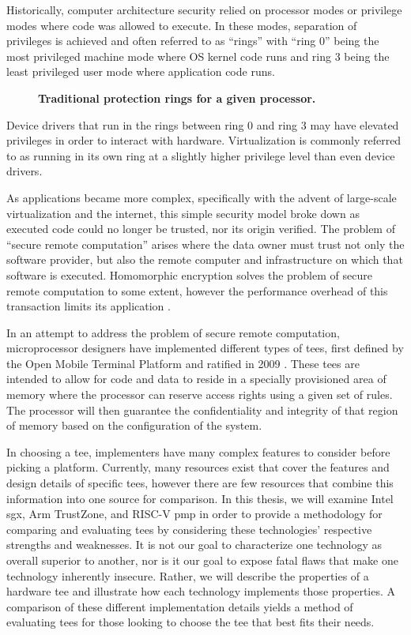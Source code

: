 Historically, computer architecture security relied on processor modes or privilege modes where code was allowed to execute. In these modes, separation of privileges is achieved and often referred to as ``rings'' with ``ring 0'' being the most privileged machine mode where OS kernel code runs and ring 3 being the least privileged user mode where application code runs.

\begin{figure}[htbp]
\centering

\caption[Protection Rings]{\textbf{Traditional protection rings for a given processor.}}
\label{fig:rings}
\end{figure}

\noindent Device drivers that run in the rings between ring 0 and ring 3 may have elevated privileges in order to interact with hardware. Virtualization is commonly referred to as running in its own ring at a slightly higher privilege level than even device drivers.  

As applications became more complex, specifically with the advent of large-scale virtualization and the internet, this simple security model broke down as executed code could no longer be trusted, nor its origin verified. The problem of ``secure remote computation'' arises where the data owner must trust not only the software provider, but also the remote computer and infrastructure on which that software is executed. Homomorphic encryption solves the problem of secure remote computation to some extent, however the performance overhead of this transaction limits its application \cite{gentryPhd}.

In an attempt to address the problem of secure remote computation, microprocessor designers have implemented different types of \glspl{tee}, first defined by the Open Mobile Terminal Platform and ratified in 2009 \cite{Confidential2009}. These \glspl{tee} are intended to allow for code and data to reside in a specially provisioned area of memory where the processor can reserve access rights using a given set of rules. The processor will then guarantee the confidentiality and integrity of that region of memory based on the configuration of the system.

In choosing a \gls{tee}, implementers have many complex features to consider before picking a platform. Currently, many resources exist that cover the features and design details of specific \glspl{tee}, however there are few resources that combine this information into one source for comparison. In this thesis, we will examine Intel \gls{sgx}, Arm TrustZone, and RISC-V \gls{pmp} in order to provide a methodology for comparing and evaluating \glspl{tee} by considering these technologies' respective strengths and weaknesses. It is not our goal to characterize one technology as overall superior to another, nor is it our goal to expose fatal flaws that make one technology inherently insecure. Rather, we will describe the properties of a hardware \gls{tee} and illustrate how each technology implements those properties. A comparison of these different implementation details yields a method of evaluating \glspl{tee} for those looking to choose the \gls{tee} that best fits their needs.

